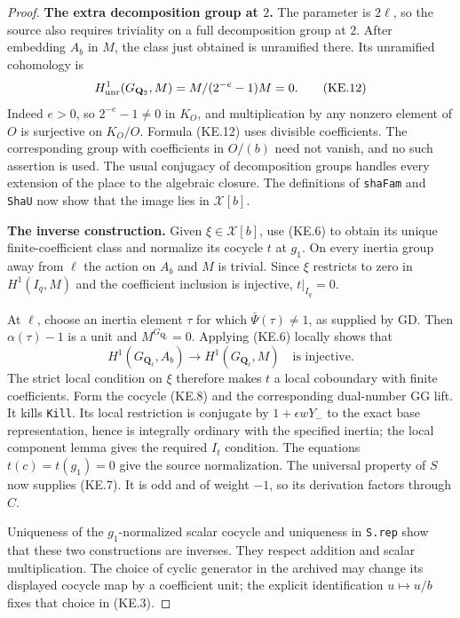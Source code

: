 \documentclass[11pt,a4paper]{article}
\theoremstyle{definition}
\renewcommand{\paragraph}[1]{\par\smallskip\noindent\textbf{#1}\quad\ignorespaces}
\begin{document}
\begin{proof}
\paragraph{The extra decomposition group at $2$.}
The parameter is $2\ell$, so the source also requires
triviality on a full decomposition group at $2$.
After embedding $A_b$ in $M$, the class just obtained
is unramified there.  Its unramified cohomology is
\[
 H^1_{\rm unr}(G_{\mathbf Q_2},M)
       =M/(2^{-e}-1)M=0.                                   \tag{KE.12}
\]
Indeed $e>0$, so $2^{-e}-1\ne0$ in $K_O$, and
multiplication by any nonzero element of $O$ is
surjective on $K_O/O$.  Formula (KE.12) uses divisible
coefficients.  The corresponding group with coefficients
in $O/(b)$ need not vanish, and no such assertion is
used.  The usual conjugacy of decomposition groups
handles every extension of the place to the algebraic
closure.  The definitions of \texttt{shaFam} and
\texttt{ShaU} now show that the image lies in
$\mathcal X[b]$.

\paragraph{The inverse construction.}
Given $\xi\in\mathcal X[b]$, use (KE.6) to obtain its
unique finite-coefficient class and normalize its
cocycle $t$ at $g_1$.  On every inertia group away from
$\ell$ the action on $A_b$ and $M$ is trivial.  Since
$\xi$ restricts to zero in $H^1(I_q,M)$ and the
coefficient inclusion is injective, $t|_{I_q}=0$.

At $\ell$, choose an inertia element $\tau$ for which
$\bar\Psi(\tau)\ne1$, as supplied by GD.  Then
$\alpha(\tau)-1$ is a unit and
$M^{G_{\mathbf Q_\ell}}=0$.  Applying (KE.6) locally
shows that
\[
 H^1(G_{\mathbf Q_\ell},A_b)
                   \longrightarrow H^1(G_{\mathbf Q_\ell},M)
                    \quad\text{is injective}.              \tag{KE.13}
\]
The strict local condition on $\xi$ therefore makes
$t$ a local coboundary with finite coefficients.  Form
the cocycle (KE.8) and the corresponding dual-number
GG lift.  It kills \texttt{Kill}.  Its local restriction
is conjugate by $1+\epsilon wY_-$ to the exact base
representation, hence is integrally ordinary with the
specified inertia; the local component lemma gives
the required $I_t$ condition.  The equations
$t(c)=t(g_1)=0$ give the source normalization.  The
universal property of $S$ now supplies (KE.7).
It is odd and of weight $-1$, so its derivation factors
through $C$.

Uniqueness of the $g_1$-normalized scalar cocycle and
uniqueness in \texttt{S.rep} show that these two
constructions are inverses.  They respect addition
and scalar multiplication.  The choice of cyclic
generator in the archived  may change
its displayed cocycle map by a coefficient unit;
the explicit identification $u\mapsto u/b$ fixes that
choice in (KE.3).


\end{proof}
\end{document}
